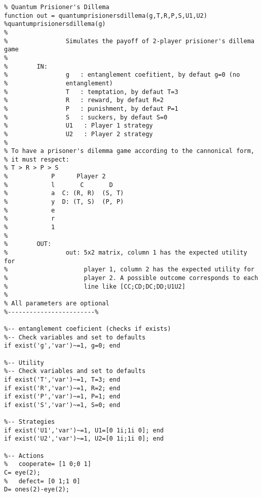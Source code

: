 \label{ap:b}


\begin{lstlisting}
% Quantum Prisioner's Dillema
function out = quantumprisionersdillema(g,T,R,P,S,U1,U2)
%quantumprisionersdillema(g)
%   
%                Simulates the payoff of 2-player prisioner's dillema game
%                 
%        IN:
%                g   : entanglement coefitient, by defaut g=0 (no
%                entanglement)
%                T   : temptation, by defaut T=3
%                R   : reward, by defaut R=2
%                P   : punishment, by defaut P=1
%                S   : suckers, by defaut S=0
%                U1   : Player 1 strategy
%                U2   : Player 2 strategy
%
% To have a prisoner's dilemma game according to the cannonical form, 
% it must respect:
% T > R > P > S
%            P      Player 2
%            l       C       D
%            a  C: (R, R)  (S, T)
%            y  D: (T, S)  (P, P)
%            e
%            r
%            1
%
%        OUT:    
%                out: 5x2 matrix, column 1 has the expected utility for
%                     player 1, column 2 has the expected utility for
%                     player 2. A possible outcome corresponds to each
%                     line like [CC;CD;DC;DD;U1U2]
%                     
% All parameters are optional
%------------------------%

%-- entanglement coeficient (checks if exists)
%-- Check variables and set to defaults
if exist('g','var')~=1, g=0; end

%-- Utility
%-- Check variables and set to defaults
if exist('T','var')~=1, T=3; end
if exist('R','var')~=1, R=2; end
if exist('P','var')~=1, P=1; end
if exist('S','var')~=1, S=0; end

%-- Strategies
if exist('U1','var')~=1, U1=[0 1i;1i 0]; end
if exist('U2','var')~=1, U2=[0 1i;1i 0]; end

%-- Actions
%   cooperate= [1 0;0 1]
C= eye(2);
%   defect= [0 1;1 0]
D= ones(2)-eye(2);


\end{lstlisting}
